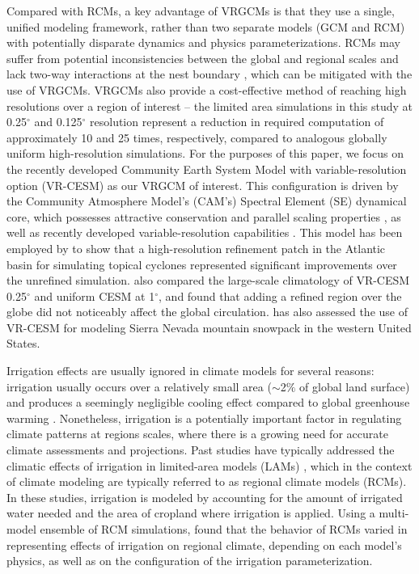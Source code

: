 Compared with RCMs, a key advantage of VRGCMs is that they use a single, unified modeling framework, rather than two separate models (GCM and RCM) with potentially disparate dynamics and physics parameterizations. RCMs may suffer from potential inconsistencies between the global and regional scales and lack two-way interactions at the nest boundary \cite{warner1997tutorial, mcdonald2003transparent, laprise2008challenging, mesinger2013limited}, which can be mitigated with the use of VRGCMs. VRGCMs also provide a cost-effective method of reaching high resolutions over a region of interest -- the limited area simulations in this study at 0.25$^\circ$ and 0.125$^\circ$ resolution represent a reduction in required computation of approximately 10 and 25 times, respectively, compared to analogous globally uniform high-resolution simulations. For the purposes of this paper, we focus on the recently developed Community Earth System Model with variable-resolution option (VR-CESM) as our VRGCM of interest. This configuration is driven by the Community Atmosphere Model's (CAM's) Spectral Element (SE) dynamical core, which possesses attractive conservation and parallel scaling properties \cite{dennis2011cam, taylor2011conservation}, as well as recently developed variable-resolution capabilities \cite{zarzycki2014aquaplanet, zarzycki2015experimental}. This model has been employed by \cite{zarzycki2014using} to show that a high-resolution refinement patch in the Atlantic basin for simulating topical cyclones represented significant improvements over the unrefined simulation. \cite{zarzycki2015effects} also compared the large-scale climatology of VR-CESM 0.25$^\circ$ and uniform CESM at 1$^\circ$, and found that adding a refined region over the globe did not noticeably affect the global circulation. \cite{rhoades2015characterizing} has also assessed the use of VR-CESM for modeling Sierra Nevada mountain snowpack in the western United States.

Irrigation effects are usually ignored in climate models for several reasons: irrigation usually occurs over a relatively small area ($\sim$2$\%$ of global land surface) and produces a seemingly negligible cooling effect compared to global greenhouse warming \cite{boucher2004direct}. Nonetheless, irrigation is a potentially important factor in regulating climate patterns at regions scales, where there is a growing need for accurate climate assessments and projections. Past studies have typically addressed the climatic effects of irrigation in limited-area models (LAMs) \cite{snyder2006regional, kueppers2007irrigation}, which in the context of climate modeling are typically referred to as regional climate models (RCMs). In these studies, irrigation is modeled by accounting for the amount of irrigated water needed and the area of cropland where irrigation is applied. Using a multi-model ensemble of RCM simulations, \cite{kueppers2008seasonal} found that the behavior of RCMs varied in representing effects of irrigation on regional climate, depending on each model's physics, as well as on the configuration of the irrigation parameterization.

